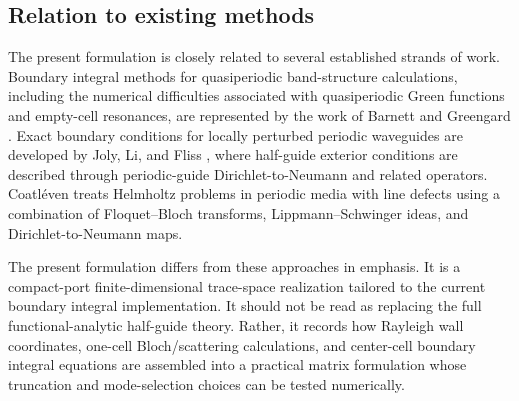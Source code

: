 \subsection{Relation to existing methods}

The present formulation is closely related to several established strands of
work.  Boundary integral methods for quasiperiodic band-structure calculations,
including the numerical difficulties associated with quasiperiodic Green
functions and empty-cell resonances, are represented by the work of Barnett and
Greengard \cite{BarnettGreengard2010}.  Exact boundary conditions for locally
perturbed periodic waveguides are developed by Joly, Li, and Fliss
\cite{JolyLiFliss2006}, where half-guide exterior conditions are described
through periodic-guide Dirichlet-to-Neumann and related operators.  Coatl\'even
\cite{Coatleven2012} treats Helmholtz problems in periodic media with line
defects using a combination of Floquet--Bloch transforms,
Lippmann--Schwinger ideas, and Dirichlet-to-Neumann maps.

The present formulation differs from these approaches in emphasis.  It is a
compact-port finite-dimensional trace-space realization tailored to the current
boundary integral implementation.  It should not be read as replacing the full
functional-analytic half-guide theory.  Rather, it records how Rayleigh wall
coordinates, one-cell Bloch/scattering calculations, and center-cell boundary
integral equations are assembled into a practical matrix formulation whose
truncation and mode-selection choices can be tested numerically.
